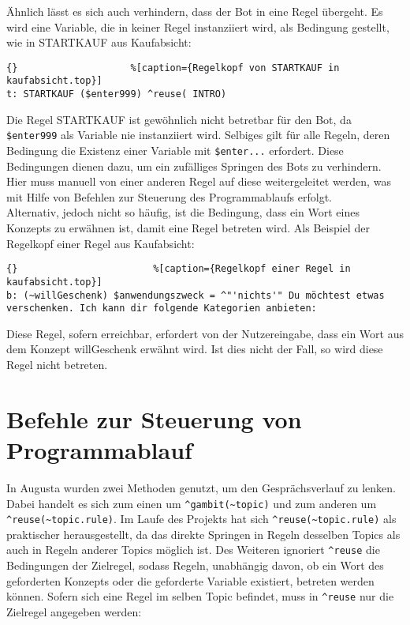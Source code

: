 Ähnlich lässt es sich auch verhindern, dass der Bot in eine Regel übergeht. Es wird eine Variable, die in keiner Regel instanziiert wird, als Bedingung gestellt, wie in STARTKAUF aus Kaufabsicht: 

\begin{lstlisting}{}					%[caption={Regelkopf von STARTKAUF in kaufabsicht.top}]
t: STARTKAUF ($enter999) ^reuse( INTRO)
\end{lstlisting}

Die Regel STARTKAUF ist gewöhnlich nicht betretbar für den Bot, da \lstinline|$enter999| als Variable nie instanziiert wird. Selbiges gilt für alle Regeln, deren Bedingung die Existenz einer Variable mit \lstinline|$enter...| erfordert. Diese Bedingungen dienen dazu, um ein zufälliges Springen des Bots zu verhindern. Hier muss manuell von einer anderen Regel auf diese weitergeleitet werden, was mit Hilfe von Befehlen zur Steuerung des Programmablaufs erfolgt.\\

Alternativ, jedoch nicht so häufig, ist die Bedingung, dass ein Wort eines Konzepts zu erwähnen ist, damit eine Regel betreten wird. Als Beispiel der Regelkopf einer Regel aus Kaufabsicht:

\begin{lstlisting}{}						%[caption={Regelkopf einer Regel in kaufabsicht.top}]
b: (~willGeschenk) $anwendungszweck = ^"'nichts'" Du möchtest etwas verschenken. Ich kann dir folgende Kategorien anbieten:
\end{lstlisting}

Diese Regel, sofern erreichbar, erfordert von der Nutzereingabe, dass ein Wort aus dem Konzept \texttildelow willGeschenk erwähnt wird. Ist dies nicht der Fall, so wird  diese Regel nicht betreten.\\


\section{Befehle zur Steuerung von Programmablauf}
\label{sec:ChatScript: Befehle zur Steuerung von Programmablauf}

In Augusta wurden zwei Methoden genutzt, um den Gesprächsverlauf zu lenken. Dabei handelt es sich zum einen um \lstinline|^gambit(~topic)| und zum anderen um \lstinline|^reuse(~topic.rule)|. Im Laufe des Projekts hat sich \lstinline|^reuse(~topic.rule)| als praktischer herausgestellt, da das direkte Springen in Regeln desselben Topics als auch in Regeln anderer Topics möglich ist. Des Weiteren ignoriert \lstinline|^reuse| die Bedingungen der Zielregel, sodass Regeln, unabhängig davon, ob ein Wort des geforderten Konzepts oder die geforderte Variable existiert, betreten werden können. Sofern sich eine Regel im selben Topic befindet, muss in \lstinline|^reuse| nur die Zielregel angegeben werden:

